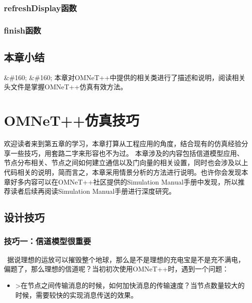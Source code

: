 \subsection{refreshDisplay函数}
\label{refreshdisplay函数}

\subsection{finish函数}
\label{finish函数}

\section{本章小结}
\label{本章小结}

\&\#160; \&\#160; 本章对OMNeT++中提供的相关类进行了描述和说明，阅读相关头文件是掌握OMNeT++仿真有效方法。

\chapter{OMNeT++仿真技巧}
\label{omnet仿真技巧}

欢迎读者来到第五章的学习，本章打算从工程应用的角度，结合现有的仿真经验分享一些技巧，用套路二字来形容也不为过。
本章涉及的内容包括信道模型应用、节点分布相关、节点之间如何建立通信以及门向量的相关设置，同时也会涉及以上代码相关的说明，简而言之，本章采用情景分析的方法进行说明。也许你会发现本章好多内容可以在OMNeT++社区提供的Simulation Manual手册中发现，所以推荐读者后续再阅读Simulation Manual手册进行深度研究。

\section{设计技巧}
\label{设计技巧}

\subsection{技巧一：信道模型很重要}
\label{技巧一：信道模型很重要}

 据说理想的运放可以摧毁整个地球，那么是不是理想的充电宝是不是充不满电，偏题了，那么理想的信道呢？当初初次使用OMNeT++时，遇到一个问题：

\begin{itemize}
\item >在节点之间传输消息的时候，如何加快消息的传输速度？当节点数量较大的时候，需要较快的实现消息传送的效果。

\end{itemize}

